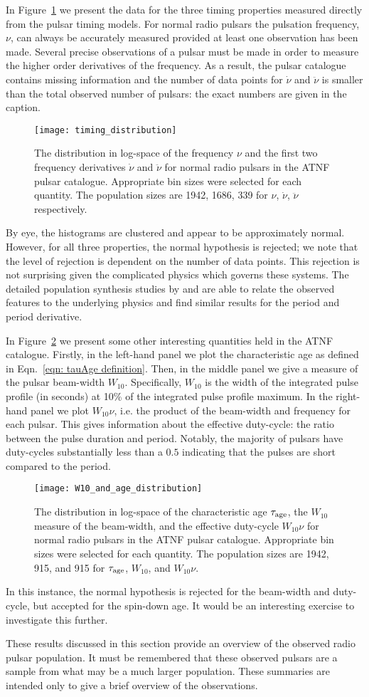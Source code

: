 In Figure~\ref{fig: pop stats timing} we present the data for the three timing
properties measured directly from the pulsar timing models. For normal radio
pulsars the pulsation frequency, $\nu$, can always be accurately measured
provided at least
one observation has been made.  Several precise observations of a pulsar must
be made in order to measure the higher order derivatives of the frequency. As a
result, the pulsar catalogue contains missing information and the number of
data points for $\dot{\nu}$ and $\ddot{\nu}$ is smaller than the total observed
number of pulsars: the exact numbers are given in the caption.
\begin{figure}[htb]
\centering
\texttt{[image: timing\_distribution]}
\caption{The distribution in log-space of the frequency $\nu$ and the first two
frequency derivatives $\dot{\nu}$ and $\ddot{\nu}$ for normal radio pulsars in the
ATNF pulsar catalogue. Appropriate bin sizes were selected for each quantity.
The population sizes are 1942, 1686, 339 for $\nu$,
$\dot{\nu}$, $\ddot{\nu}$ respectively.}
\label{fig: pop stats timing}
\end{figure}
By eye, the histograms are clustered and appear to be approximately normal.
However, for all three properties, the normal hypothesis is rejected; we note
that the level of rejection is dependent on the number of data points. This
rejection is not surprising given the complicated physics which governs these
systems. The detailed population synthesis studies by \citet{faucher2006birth}
and \citet{popov2010population} are able to relate the observed features to the
underlying physics and find similar results for the period and period
derivative.

In Figure~\ref{fig: pop stats others} we present some other interesting quantities
held in the ATNF catalogue. Firstly, in the left-hand panel we plot the characteristic
age as defined in Eqn.~\eqref{eqn: tauAge definition}. Then, in the middle panel
we give a measure of the pulsar beam-width $W_{10}$. Specifically, $W_{10}$ is
the width of the integrated pulse profile (in seconds) at 10\% of the integrated
pulse profile maximum. In the right-hand panel we  plot $W_{10}\nu$, i.e. the
product of the beam-width and frequency for each pulsar. This gives information
about the effective duty-cycle: the ratio between the pulse duration and period.
Notably, the majority of pulsars have duty-cycles substantially less than a
$0.5$ indicating that the pulses are short compared to the period.
\begin{figure}[htb]
\centering
\texttt{[image: W10\_and\_age\_distribution]}
\caption{The distribution in log-space of the characteristic age
$\tau_{\mathrm{age}}$, the $W_{10}$ measure of the beam-width, and the
effective duty-cycle $W_{10} \nu$ for normal radio pulsars in the
ATNF pulsar catalogue. Appropriate bin sizes were selected for each quantity.
The population sizes are 1942, 915, and 915 for
$\tau_{\mathrm{age}}$, $W_{10}$, and $W_{10}\nu$.}
\label{fig: pop stats others}
\end{figure}
In this instance, the normal hypothesis is rejected for the beam-width and
duty-cycle, but accepted for the spin-down age. It would be an interesting
exercise to investigate this further.

These results discussed in this section provide an overview of the observed
radio pulsar population. It must be remembered that these observed pulsars
are a sample from what may be a much larger population. These summaries are
intended only to give a brief overview of the observations.

